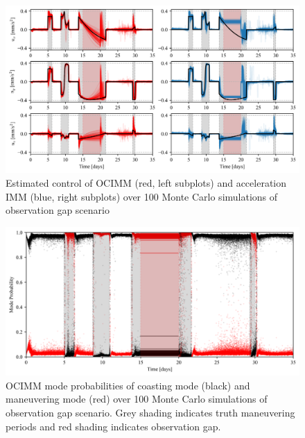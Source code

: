 \documentclass[letterpaper, preprint, paper,11pt]{AAS}	%
\begin{document}
\begin{figure}
    \centering
    \includegraphics[width=1\linewidth]{Figures/control.png}
    \caption{Estimated control of OCIMM (red, left subplots) and acceleration IMM (blue, right subplots) over 100 Monte Carlo simulations of observation gap scenario}
    \label{fig:control}
\end{figure}

\begin{figure}
    \centering
    \includegraphics[width=1\linewidth]{Figures/mode_probabilities.png}
    \caption{OCIMM mode probabilities of coasting mode (black) and maneuvering mode (red) over 100 Monte Carlo simulations of observation gap scenario. Grey shading indicates truth maneuvering periods and red shading indicates observation gap. }
    \label{fig:mode-probabilities}
\end{figure}
\end{document}
